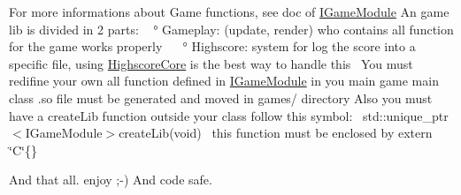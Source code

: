 For more informations about Game functions, see doc of \hyperlink{class_i_game_module}{I\+Game\+Module} An game lib is divided in 2 parts\+: ~\newline
° Gameplay\+: (update, render) who contains all function for the game works properly~\newline
~\newline
° Highscore\+: system for log the score into a specific file, using \hyperlink{class_highscore_core}{Highscore\+Core} is the best way to handle this~\newline
 You must redifine your own all function defined in \hyperlink{class_i_game_module}{I\+Game\+Module} in you main game main class  .so file must be generated and moved in games/ directory Also you must have a create\+Lib function outside your class follow this symbol\+:~\newline
 std\+::unique\+\_\+ptr$<$\+I\+Game\+Module$>$create\+Lib(void)~\newline
 this function must be enclosed by extern \char`\"{}\+C\char`\"{}\{\}

And that all. enjoy ;-\/) And code safe. 